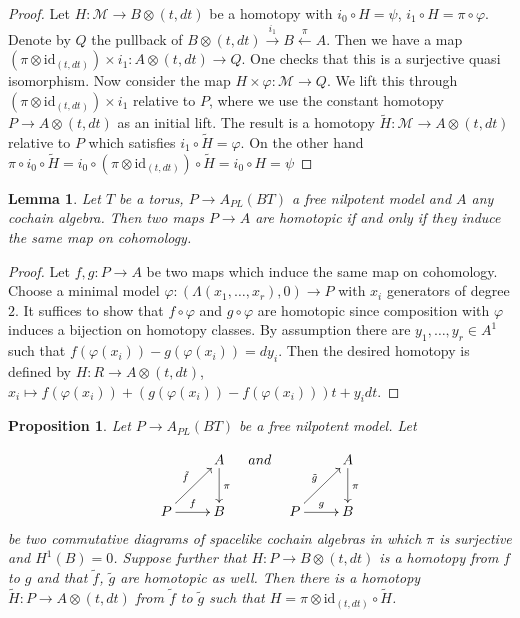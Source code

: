 \documentclass[12pt,a4paper]{article}
\newcommand{\id}{\mathrm{id}}
\newtheorem{prop}[thm]{Proposition}
\newtheorem{lem}[thm]{Lemma}
\theoremstyle{definition}
\begin{document}
\begin{proof}
Let $H\colon \mathcal{M}\rightarrow B\otimes (t,dt)$ be a homotopy with $i_0\circ H=\psi$, $i_1\circ H=\pi\circ\varphi$. Denote by $Q$ the pullback of $B\otimes (t,dt)\xrightarrow{i_1} B\xleftarrow{\pi} A$. Then we have a map $(\pi\otimes \id_{(t,dt)})\times i_1\colon A\otimes (t,dt)\rightarrow Q$. One checks that this is a surjective quasi isomorphism.
Now consider the map $H\times \varphi\colon \mathcal{M}\rightarrow Q$. We lift this through $(\pi\otimes \id_{(t,dt)})\times i_1$ relative to $P$, where we use the constant homotopy $P\rightarrow A\otimes (t,dt)$ as an initial lift.
The result is a homotopy $\tilde{H}\colon \mathcal{M}\rightarrow A\otimes (t,dt)$ relative to $P$ which satisfies $i_1\circ \tilde{H}=\varphi$. On the other hand $\pi\circ i_0\circ \tilde{H}=i_0\circ (\pi\otimes \id_{(t,dt)})\circ \tilde{H}=i_0\circ H=\psi$
\end{proof}

\begin{lem}\label{lem:cohomohomotopy}
Let $T$ be a torus, $P\rightarrow A_{PL}(BT)$ a free nilpotent model and $A$ any cochain algebra. Then two maps $P\rightarrow A$ are homotopic if and only if they induce the same map on cohomology.
\end{lem}

\begin{proof}
Let $f,g\colon P\rightarrow A$ be two maps which induce the same map on cohomology.
Choose a minimal model $\varphi\colon(\Lambda (x_1,\ldots,x_r),0)\rightarrow P$ with $x_i$ generators of degree $2$. It suffices to show that $f\circ\varphi$ and $g\circ\varphi$ are homotopic since composition with $\varphi$ induces a bijection on homotopy classes. By assumption there are $y_1,\ldots,y_r\in A^1$ such that $f(\varphi(x_i))-g(\varphi(x_i))=dy_i$. Then the desired homotopy is defined by $H\colon R\rightarrow A\otimes (t,dt)$, $x_i\mapsto f(\varphi(x_i))+(g(\varphi(x_i))-f(\varphi(x_i)))t+y_idt$.
\end{proof}

\begin{prop}\label{prop:coveringhomotopy}
Let $P\rightarrow A_{PL}(BT)$ be a free nilpotent model. Let

\[\xymatrix{
 & A\ar[d]^\pi\\ P\ar[ur]^{\tilde{f}}\ar[r]^f & B
}
\quad and \quad
\xymatrix{
 & A\ar[d]^\pi\\ P\ar[ur]^{\tilde{g}}\ar[r]^g & B
}\]
be two commutative diagrams of spacelike cochain algebras in which $\pi$ is surjective and $H^1(B)=0$. Suppose further that $H\colon P\rightarrow B\otimes (t,dt)$ is a homotopy from $f$ to $g$ and that $\tilde{f}$, $\tilde{g}$ are homotopic as well. Then there is a homotopy $\tilde{H}\colon P\rightarrow A\otimes (t,dt)$ from $\tilde{f}$ to $\tilde{g}$ such that ${H}=\pi\otimes \id_{(t,dt)}\circ \tilde{H}$.
\end{prop}
\end{document}
